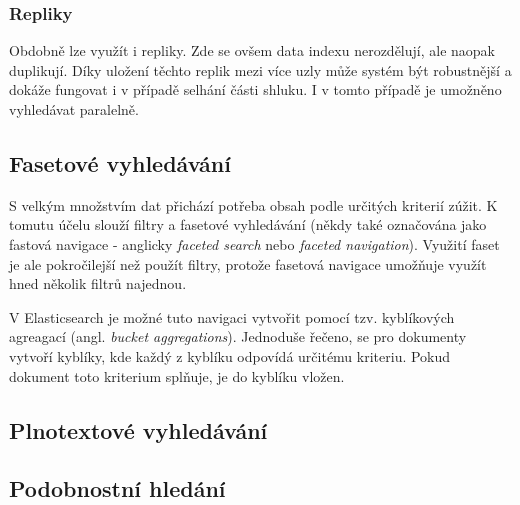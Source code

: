\subsubsection*{Repliky}
Obdobně lze využít i repliky. Zde se ovšem data indexu nerozdělují, ale naopak duplikují. Díky uložení těchto replik mezi více uzly může systém být robustnější a dokáže fungovat i v případě selhání části shluku. I v tomto případě je umožněno vyhledávat paralelně. 

\subsection{Fasetové vyhledávání}
S velkým množstvím dat přichází potřeba obsah podle určitých kriterií zúžit. K tomutu účelu slouží filtry a fasetové vyhledávání (někdy také označována jako fastová navigace - anglicky \emph{faceted search} nebo \emph{faceted navigation}). Využití faset je ale pokročilejší než použít filtry, protože fasetová navigace umožňuje využít hned několik filtrů najednou. %

V Elasticsearch je možné tuto navigaci vytvořit pomocí tzv. kyblíkových agreagací (angl. \emph{bucket aggregations}).
Jednoduše řečeno, se pro dokumenty vytvoří kyblíky, kde každý z kyblíku odpovídá určitému kriteriu. Pokud dokument toto kriterium splňuje, je do kyblíku vložen.

\subsection{Plnotextové vyhledávání}
\blindtext[2]

\subsection{Podobnostní hledání}
\blindtext[2]